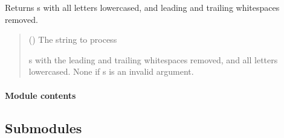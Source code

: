 \documentclass[letterpaper,10pt,english]{sphinxmanual}
\begin{document}
\begin{fulllineitems}
\label{\detokenize{apache_commons_validator_python.util:apache_commons_validator_python.util.validator_utils.to_lower}}
\pysigstartsignatures
{}
\pysigstopsignatures
\sphinxAtStartPar
Returns s with all letters lowercased, and leading and trailing whitespaces
removed.
\begin{quote}\begin{description}
\sphinxAtStartPar
{} () \textendash{} The string to process

\sphinxAtStartPar
s with the leading and trailing whitespaces removed, and all letters lowercased.
None if s is an invalid argument.

\end{description}\end{quote}

\end{fulllineitems}



\paragraph{Module contents}
\label{\detokenize{apache_commons_validator_python.util:module-apache_commons_validator_python.util}}\label{\detokenize{apache_commons_validator_python.util:module-contents}}

\subsection{Submodules}
\label{\detokenize{apache_commons_validator_python:submodules}}
\end{document}
